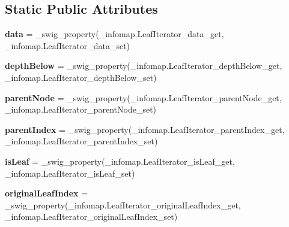 \subsection*{Static Public Attributes}
\begin{DoxyCompactItemize}
\item 
\mbox{\label{classinfomap_1_1LeafIterator_ad2ea562e0e59b241cdb5272f4879ab1d}} 
{\bfseries data} = \+\_\+swig\+\_\+property(\+\_\+infomap.\+Leaf\+Iterator\+\_\+data\+\_\+get, \+\_\+infomap.\+Leaf\+Iterator\+\_\+data\+\_\+set)
\item 
\mbox{\label{classinfomap_1_1LeafIterator_a2b0d533d4511f3ce68b4810107834d23}} 
{\bfseries depth\+Below} = \+\_\+swig\+\_\+property(\+\_\+infomap.\+Leaf\+Iterator\+\_\+depth\+Below\+\_\+get, \+\_\+infomap.\+Leaf\+Iterator\+\_\+depth\+Below\+\_\+set)
\item 
\mbox{\label{classinfomap_1_1LeafIterator_a86eb4ef3f31a340dfc81a518cbd097d9}} 
{\bfseries parent\+Node} = \+\_\+swig\+\_\+property(\+\_\+infomap.\+Leaf\+Iterator\+\_\+parent\+Node\+\_\+get, \+\_\+infomap.\+Leaf\+Iterator\+\_\+parent\+Node\+\_\+set)
\item 
\mbox{\label{classinfomap_1_1LeafIterator_acfcc37d09d90a05de75ec6b8e2dcc335}} 
{\bfseries parent\+Index} = \+\_\+swig\+\_\+property(\+\_\+infomap.\+Leaf\+Iterator\+\_\+parent\+Index\+\_\+get, \+\_\+infomap.\+Leaf\+Iterator\+\_\+parent\+Index\+\_\+set)
\item 
\mbox{\label{classinfomap_1_1LeafIterator_ae8fe30edab8fe5b56ec2860f7aac819b}} 
{\bfseries is\+Leaf} = \+\_\+swig\+\_\+property(\+\_\+infomap.\+Leaf\+Iterator\+\_\+is\+Leaf\+\_\+get, \+\_\+infomap.\+Leaf\+Iterator\+\_\+is\+Leaf\+\_\+set)
\item 
\mbox{\label{classinfomap_1_1LeafIterator_aaaffb15e43cc790ffdcaee69ba81d0a6}} 
{\bfseries original\+Leaf\+Index} = \+\_\+swig\+\_\+property(\+\_\+infomap.\+Leaf\+Iterator\+\_\+original\+Leaf\+Index\+\_\+get, \+\_\+infomap.\+Leaf\+Iterator\+\_\+original\+Leaf\+Index\+\_\+set)
\item 
\mbox{\label{classinfomap_1_1LeafIterator_af1896683186e4f77bf48b84bf5b41ba8}} 

\end{DoxyCompactItemize}
